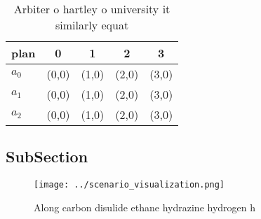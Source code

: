 \documentclass[a4paper]{article}
\begin{document}
\begin{table}
\begin{adjustbox}{width=0.6\columnwidth}
\begin{tabular}{|l|l|l|l|l|}
\hline
\textbf{plan} & \multicolumn{1}{c|}{\textbf{0}} & \multicolumn{1}{c|}{\textbf{1}} & \multicolumn{1}{c|}{\textbf{2}} & \multicolumn{1}{c|}{\textbf{3}} \\ \hline
\textbf{$a_0$}  & (0,0) & (1,0) & (2,0) & (3,0) \\ \hline
\textbf{$a_1$}  & (0,0) & (1,0) & (2,0) & (3,0) \\ \hline
\textbf{$a_2$}  & (0,0) & (1,0) & (2,0) & (3,0) \\ \hline
\end{tabular}
\end{adjustbox}
\caption{Arbiter o hartley o university it similarly equat
}
\end{table}

\subsection{SubSection}

\begin{figure}
\centering
\texttt{[image: ../scenario\_visualization.png]}
\caption{Along carbon disulide ethane hydrazine hydrogen h
}
\end{figure}
 
\end{document}
